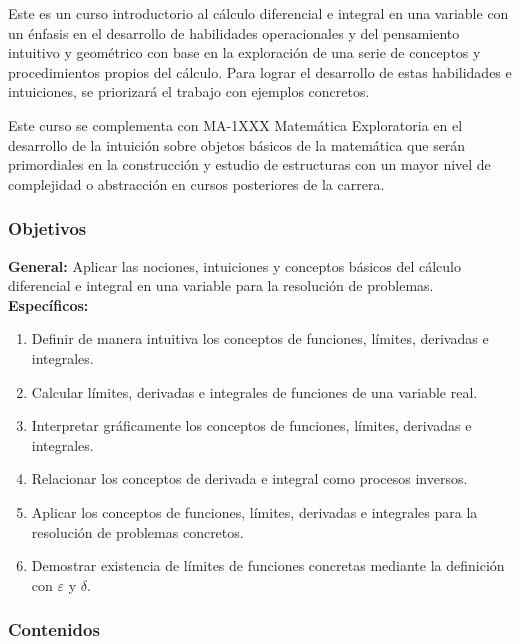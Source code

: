 \begin{refsection}
Este es un curso introductorio al cálculo diferencial e integral en una variable con un énfasis en el desarrollo de habilidades operacionales y del pensamiento intuitivo y geométrico con base en la exploración de una serie de conceptos y procedimientos propios del cálculo. Para lograr el desarrollo de estas habilidades e intuiciones, se priorizará el trabajo con ejemplos concretos.

Este curso se complementa con MA-1XXX Matemática Exploratoria en el desarrollo de la intuición sobre objetos básicos de la matemática que serán primordiales en la construcción y estudio de estructuras con un mayor nivel de complejidad o abstracción en cursos posteriores de la carrera.




\subsubsection*{Objetivos}

\textbf{General:} Aplicar las nociones, intuiciones y conceptos básicos del cálculo diferencial e integral en una variable para la resolución de problemas. \\

\textbf{Específicos:}

\begin{enumerate}
\item Definir de manera intuitiva los conceptos de funciones, límites, derivadas e integrales.
\item Calcular límites, derivadas e integrales de funciones de una variable real.
\item Interpretar gráficamente los conceptos de funciones, límites, derivadas e integrales.
\item Relacionar los conceptos de derivada e integral como procesos inversos.
\item Aplicar los conceptos de funciones, límites, derivadas e integrales para la resolución de problemas concretos.
\item Demostrar existencia de límites de funciones concretas mediante la definición con $\varepsilon$ y $\delta$.
\end{enumerate}

\subsubsection*{Contenidos}


\end{refsection}
